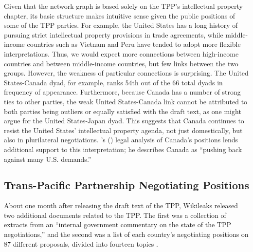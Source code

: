 \documentclass[12pt]{article}
\def\citeapos#1{\citeauthor{#1}'s (\citeyear{#1})} %
\begin{document}
Given that the network graph is based solely on the TPP's intellectual property chapter, 
its basic structure makes intuitive sense given the public positions of some of the TPP parties. 
For example, the United States has a long history of pursuing strict intellectual property provisions 
in trade agreements, while middle-income countries such as Vietnam and Peru have tended to adopt more 
flexible interpretations. Thus, we would expect more connections between high-income countries and between 
middle-income countries, but few links between the two groups. However, the weakness of particular 
connections is surprising. The United States-Canada dyad, 
for example, ranks 54th out of the 66 total dyads in frequency of appearance. Furthermore, because Canada has a 
number of strong ties to other parties, the weak United States-Canada link cannot be attributed to 
both parties being outliers or equally satisfied with the draft text, as one might argue for the 
United States-Japan dyad. This suggests that Canada continues to resist the United States' intellectual property 
agenda, not just domestically, but also in plurilateral negotiations. \citeapos{michael_geist2013trans} legal analysis of Canada's positions lends additional 
support to this interpretation; he describes Canada as ``pushing back against many U.S. demands.''

\subsection{Trans-Pacific Partnership Negotiating Positions}
\label{tpp_np}


About one month after releasing the draft text of the TPP, Wikileaks released two 
additional documents related to the TPP. The first was a collection of extracts from an ``internal 
government commentary on the state of the TPP negotiations,'' and the second was a list of each 
country's negotiating positions on 87 different proposals, divided into fourteen topics \citep{wikileaks2013second}.
\end{document}
